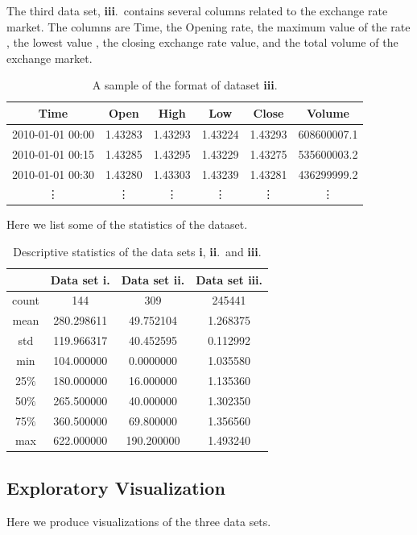 \documentclass[10pt,a4paper]{article}
\begin{document}
The third data set, {\bf iii}.~contains several columns related to the exchange rate market. The columns are Time, the Opening rate, the maximum value of the rate , the lowest value , the closing exchange rate value, and the total volume of the exchange market.

\begin{table}[h]
\centering
\begin{tabular}{ c c c c c c }
            Time &     Open &    High &    Low &   Close   &  Volume \\ \hline
2010-01-01 00:00 &  1.43283 & 1.43293 & 1.43224 & 1.43293 & 608600007.1 \\
2010-01-01 00:15 &  1.43285 & 1.43295 & 1.43229 & 1.43275 & 535600003.2 \\
2010-01-01 00:30 &  1.43280 & 1.43303 & 1.43239 & 1.43281 &  436299999.2 \\
\vdots  &  \vdots  & \vdots  & \vdots  & \vdots  &  \vdots 
\end{tabular}
\caption{A sample of the format of dataset {\bf iii}.}
\label{table: sample format of dataset iii}
\end{table}

Here we list some of the statistics of the dataset.

\begin{table}[h]
\centering
\begin{tabular}{c | c | c | c}
     &    Data set {\bf i.} & Data set {\bf ii.} &  Data set {\bf iii.} \\ \hline
count &  144 & 309 & 245441  \\
mean &  280.298611 & 49.752104 & 1.268375  \\
std  &  119.966317 & 40.452595 & 0.112992  \\
min  &  104.000000 & 0.0000000 & 1.035580 \\
25$\%$  &  180.000000 & 16.000000 & 1.135360 \\
50$\%$  &  265.500000 & 40.000000 & 1.302350  \\
75$\%$  &  360.500000 & 69.800000 & 1.356560 \\
max  &  622.000000 &  190.200000 & 1.493240 
\end{tabular}
\caption{Descriptive statistics of the data sets {\bf i}, {\bf ii}.~and {\bf iii}.}
\label{table: descriptive statistics of datasets}
\end{table}

\newpage
\subsection{Exploratory Visualization}
%
%
Here we produce visualizations of the three data sets. 
\end{document}
